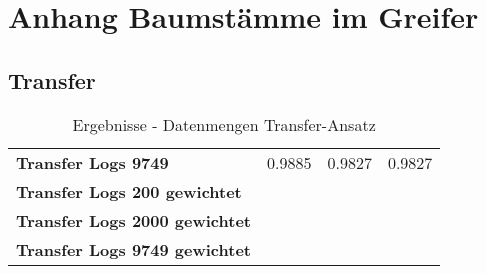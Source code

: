 \chapter{Anhang Baumstämme im Greifer}
\label{appendix:BaumstammImGreifer}


	\section{Transfer}
	\label{appendix:Transfer}



	\begin{table}[ht]
	\centering
	\begin{tabularx}{\textwidth}{llll}
		\textbf{Transfer Logs 9749} 				 & 	0.9885			& 0.9827	 & 0.9827	\\ \rowcolor{Gray}
		\textbf{Transfer Logs 200 gewichtet}	 	  &  	   &  	\\		
		\textbf{Transfer Logs 2000 gewichtet}	 	  &  	   &  	\\	
		\textbf{Transfer Logs 9749 gewichtet}	 	  &  	   &  	\\	
	\end{tabularx}
	\caption{Ergebnisse - Datenmengen Transfer-Ansatz}
	\label{table:Ergebnisse_Transfer_Logs}
\end{table}